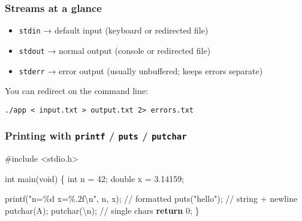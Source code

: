 \documentclass[
  letterpaper,
  DIV=11,
  numbers=noendperiod]{scrreprt}
\newenvironment{Shaded}{\begin{snugshade}}{\end{snugshade}}
\newcommand{\CharTok}[1]{\textcolor[rgb]{0.13,0.47,0.30}{#1}}
\newcommand{\CommentTok}[1]{\textcolor[rgb]{0.37,0.37,0.37}{#1}}
\newcommand{\ControlFlowTok}[1]{\textcolor[rgb]{0.00,0.23,0.31}{\textbf{#1}}}
\newcommand{\DataTypeTok}[1]{\textcolor[rgb]{0.68,0.00,0.00}{#1}}
\newcommand{\DecValTok}[1]{\textcolor[rgb]{0.68,0.00,0.00}{#1}}
\newcommand{\FloatTok}[1]{\textcolor[rgb]{0.68,0.00,0.00}{#1}}
\newcommand{\ImportTok}[1]{\textcolor[rgb]{0.00,0.46,0.62}{#1}}
\newcommand{\NormalTok}[1]{\textcolor[rgb]{0.00,0.23,0.31}{#1}}
\newcommand{\OperatorTok}[1]{\textcolor[rgb]{0.37,0.37,0.37}{#1}}
\newcommand{\PreprocessorTok}[1]{\textcolor[rgb]{0.68,0.00,0.00}{#1}}
\newcommand{\SpecialCharTok}[1]{\textcolor[rgb]{0.37,0.37,0.37}{#1}}
\newcommand{\StringTok}[1]{\textcolor[rgb]{0.13,0.47,0.30}{#1}}
\providecommand{\tightlist}{%
  \setlength{\itemsep}{0pt}\setlength{\parskip}{0pt}}
\begin{document}
\subsubsection{Streams at a glance}\label{streams-at-a-glance}

\begin{itemize}
\tightlist
\item
  \texttt{stdin} → default input (keyboard or redirected file)
\item
  \texttt{stdout} → normal output (console or redirected file)
\item
  \texttt{stderr} → error output (usually unbuffered; keeps errors
  separate)
\end{itemize}

You can redirect on the command line:

\begin{verbatim}
./app < input.txt > output.txt 2> errors.txt
\end{verbatim}

\subsubsection{\texorpdfstring{Printing with \texttt{printf} /
\texttt{puts} /
\texttt{putchar}}{Printing with printf / puts / putchar}}\label{printing-with-printf-puts-putchar}

\begin{Shaded}
\begin{Highlighting}[]
\PreprocessorTok{\#include }\ImportTok{\textless{}stdio.h\textgreater{}}

\DataTypeTok{int}\NormalTok{ main}\OperatorTok{(}\DataTypeTok{void}\OperatorTok{)} \OperatorTok{\{}
    \DataTypeTok{int}\NormalTok{ n }\OperatorTok{=} \DecValTok{42}\OperatorTok{;}
    \DataTypeTok{double}\NormalTok{ x }\OperatorTok{=} \FloatTok{3.14159}\OperatorTok{;}

\NormalTok{    printf}\OperatorTok{(}\StringTok{"n=}\SpecialCharTok{\%d}\StringTok{ x=}\SpecialCharTok{\%.2f\textbackslash{}n}\StringTok{"}\OperatorTok{,}\NormalTok{ n}\OperatorTok{,}\NormalTok{ x}\OperatorTok{);}   \CommentTok{// formatted}
\NormalTok{    puts}\OperatorTok{(}\StringTok{"hello"}\OperatorTok{);}                   \CommentTok{// string + newline}
\NormalTok{    putchar}\OperatorTok{(}\CharTok{\textquotesingle{}A\textquotesingle{}}\OperatorTok{);}\NormalTok{ putchar}\OperatorTok{(}\CharTok{\textquotesingle{}}\SpecialCharTok{\textbackslash{}n}\CharTok{\textquotesingle{}}\OperatorTok{);}     \CommentTok{// single chars}
    \ControlFlowTok{return} \DecValTok{0}\OperatorTok{;}
\OperatorTok{\}}
\end{Highlighting}
\end{Shaded}
\end{document}
